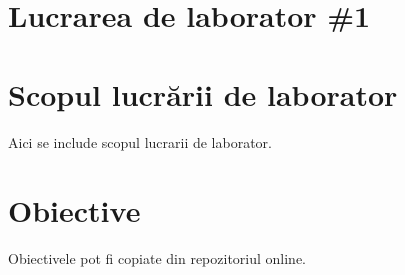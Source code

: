 \section*{Lucrarea de laborator \#1}

\section{Scopul lucrării de laborator}
Aici se include scopul lucrarii de laborator.

\section{Obiective}
Obiectivele pot fi copiate din repozitoriul online.

\clearpage
